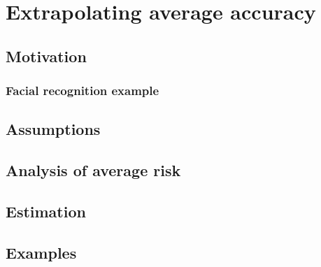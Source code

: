 
\chapter{Extrapolating average accuracy} %

\label{Chapter3} %

\section{Motivation}

\subsection{Facial recognition example}

\section{Assumptions}

\section{Analysis of average risk}

\section{Estimation}

\section{Examples}

